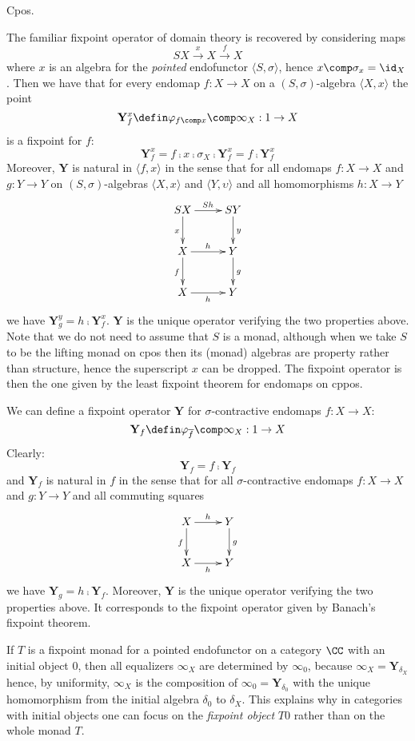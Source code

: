\documentclass[11pt,a4paper]{article}
\newcommand{\tuple}[1]{\langle #1 \rangle }
\newcommand{\efunctor}{S}
\newcommand{\contr}{\sigma}
\newcommand{\factored}[1]{\overline{#1}}
\newcommand{\fp}{\mathbf{Y}}
\newcommand{\fpc}{\mathbf{Y}}
\newcommand{\pointedfunctor}{\tuple{\efunctor , \contr}}
\newcommand{\isom}[1]{\varphi_{#1}}
\newcommand{\ti}{T}
\newcommand{\esse}{S}
\begin{document}
\begin{example}
  Cpos.

The familiar fixpoint operator of domain theory 
is recovered by considering maps 
$$\esse X \stackrel{x}{\rightarrow} X \stackrel{f}{\rightarrow} X$$
where $x$ is an algebra for the \emph{pointed} endofunctor $\pointedfunctor$,
hence $x\comp \contr_x = \id_X$.
Then we have that for every endomap $f:X\rightarrow X$
on a $(\esse , \contr )$-algebra $\tuple{X,x }$
the point
$$\fp^x_f \defin \isom{f\comp x} \comp \infty_X : 1\rightarrow X$$
is a fixpoint for $f$:
$$\fp^x_f = f \comp x \comp \contr_X \comp \fp^x_f = f \comp \fp^x_f$$
Moreover,
$\fp$ is natural in $\tuple{f,x}$ in the sense that 
for all endomaps 
$f: X\rightarrow X$ and $g:Y\rightarrow Y$
on $(\esse , \contr )$-algebras $\tuple{X,x }$ and $\tuple{Y,\upsilon }$
and all homomorphisms $h:X \rightarrow Y$
$$\xymatrix{
\esse X \ar[d]_{x} \ar[r]^{\esse h} 
     & \esse Y\ar[d]^{y}
\\
X \ar[d]_{f} \ar[r]^{h} 
     & Y\ar[d]^{g}
\\
X \ar[r]_h &  Y
}
$$
we have $\fp^y_g = h\comp \fp^x_f$.
$\fp$ is the unique operator verifying the two properties above.
Note that we do not need to assume that $\esse$ is a monad,
although when we take $\esse$ to be the
lifting monad on cpos then its (monad) algebras
are property rather than
structure, hence the superscript $x$ can be dropped.
The fixpoint operator is then the one given
by the least fixpoint theorem for 
endomaps on cppos.
\end{example}

\begin{example}
We can define a fixpoint operator
$\fp$ for $\contr$-contractive endomaps
$f:X\rightarrow X$:
$$\fp_f \defin \isom{\factored{f}} \comp \infty_X : 1\rightarrow X$$
Clearly:
$$\fp_f = f \comp \fp_f$$
and
$\fp_f$ is natural in $f$ in the sense that 
for all $\contr$-contractive endomaps 
$f: X\rightarrow X$ and $g:Y\rightarrow Y$
and all commuting squares
$$\xymatrix{
X \ar[d]_{f} \ar[r]^{h} 
     & Y\ar[d]^{g}
\\
X \ar[r]_h &  Y
}$$
we have $\fp_g = h\comp \fp_f$.
Moreover,
$\fp$ is the unique operator verifying the two properties above.
It corresponds to the fixpoint operator given
by Banach's fixpoint theorem.
\end{example}

\begin{remark}
  If $\ti$
is a fixpoint monad for
a pointed endofunctor on a category
$\CC$ with an initial object $0$,
then all equalizers $\infty_X$
are determined by $\infty_0$,
because $\infty_X = \fpc_{\delta_X}$
hence, by uniformity,
$\infty_X$ is the composition of
$\infty_0 = \fpc_{\delta_0}$
with the unique homomorphism from the initial algebra $\delta_0$
to $\delta_X$.
This explains why
in categories with initial objects
one can focus on the \emph{fixpoint object} $\ti 0$
rather than on the whole monad $\ti$.
\end{remark}
\end{document}
